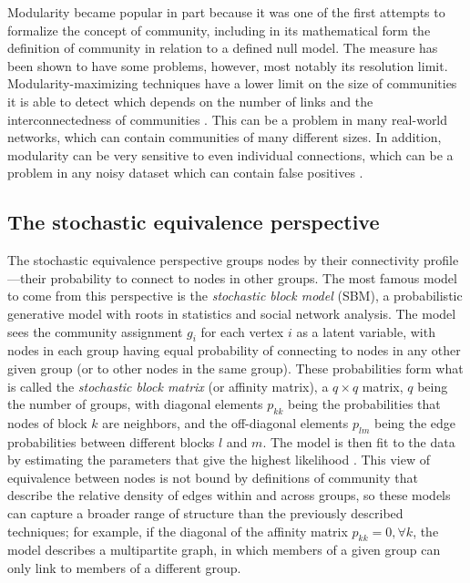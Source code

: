 Modularity became popular in part because it was one of the first
attempts to formalize the concept of community, including in its
mathematical form the definition of community in relation to a defined
null model. The measure has been shown to have some problems, however,
most notably its resolution limit. Modularity-maximizing techniques have
a lower limit on the size of communities it is able to detect which
depends on the number of links and the interconnectedness of communities
\autocite{fortunato_resolution_2007}. This can be a problem in many
real-world networks, which can contain communities of many different
sizes. In addition, modularity can be very sensitive to even individual
connections, which can be a problem in any noisy dataset which can
contain false positives \autocite{fortunato_community_2010}.

\hypertarget{the-stochastic-equivalence-perspective}{\subsection{The
stochastic equivalence
perspective}\label{the-stochastic-equivalence-perspective}}

The stochastic equivalence perspective groups nodes by their
connectivity profile---their probability to connect to nodes in other
groups. The most famous model to come from this perspective is the
\emph{stochastic block model} (SBM), a probabilistic generative model
with roots in statistics and social network analysis. The model sees the
community assignment \(g_i\) for each vertex \(i\) as a latent variable,
with nodes in each group having equal probability of connecting to nodes
in any other given group (or to other nodes in the same group). These
probabilities form what is called the \emph{stochastic block matrix} (or
affinity matrix), a \(q \times q\) matrix, \(q\) being the number of
groups, with diagonal elements \(p_{kk}\) being the probabilities that
nodes of block \(k\) are neighbors, and the off-diagonal elements
\(p_{lm}\) being the edge probabilities between different blocks \(l\)
and \(m\). The model is then fit to the data by estimating the
parameters that give the highest likelihood
\autocites{fortunato_community_2016}{schaub_many_2017}. This view of
equivalence between nodes is not bound by definitions of community that
describe the relative density of edges within and across groups, so
these models can capture a broader range of structure than the
previously described techniques; for example, if the diagonal of the
affinity matrix \(p_{kk} = 0, \forall k\), the model describes a
multipartite graph, in which members of a given group can only link to
members of a different group.

